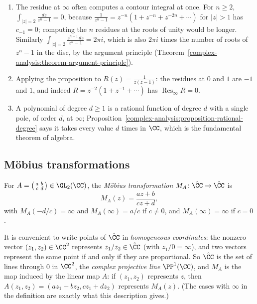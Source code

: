 \begin{example}\label{complex-analysis:example-residue-infinity}
\begin{enumerate}
\item The residue at $\infty$ often computes a contour integral at once. For $n \geq 2$, $\int_{|z| = 2}\frac{dz}{z^n - 1} = 0$, because $\frac{1}{z^n - 1} = z^{-n}(1 + z^{-n} + z^{-2n} + \cdots)$ for $|z| > 1$ has
$c_{-1} = 0$; computing the $n$ residues at the roots of unity would be longer. Similarly $\int_{|z| = 2}\frac{z^{n-1}\,dz}{z^n - 1} = 2\pi i$, which is also $2\pi i$ times the number of roots of $z^n - 1$ in the
disc, by the argument principle (Theorem~\ref{complex-analysis:theorem-argument-principle}).
\item Applying the proposition to $R(z) = \frac{1}{z(z - 1)}$: the residues at $0$ and $1$ are $-1$ and $1$, and indeed $R = z^{-2}(1 + z^{-1} + \cdots)$ has $\operatorname{Res}_\infty R = 0$.
\item A polynomial of degree $d \geq 1$ is a rational function of degree $d$ with a single pole, of order $d$, at $\infty$; Proposition~\ref{complex-analysis:proposition-rational-degree} says it takes every value $d$
times in $\CC$, which is the fundamental theorem of algebra.
\end{enumerate}
\end{example}

\subsection{M\"obius transformations}\label{complex-analysis:subsection-mobius}

\begin{definition}\label{complex-analysis:definition-mobius}
For $A = \bigl(\begin{smallmatrix}a & b\\ c & d\end{smallmatrix}\bigr) \in \GL_2(\CC)$, the \emph{M\"obius transformation} $M_A \colon \hat{\CC} \to \hat{\CC}$ is
\[
M_A(z) = \frac{az + b}{cz + d},
\]
with $M_A(-d/c) = \infty$ and $M_A(\infty) = a/c$ if $c \neq 0$, and $M_A(\infty) = \infty$ if $c = 0$.
\end{definition}

It is convenient to write points of $\hat{\CC}$ in \emph{homogeneous coordinates}: the nonzero vector $(z_1, z_2) \in \CC^2$ represents $z_1/z_2 \in \hat{\CC}$ (with $z_1/0 = \infty$), and two vectors represent the same
point if and only if they are proportional. So $\hat{\CC}$ is the set of lines through $0$ in $\CC^2$, the \emph{complex projective line} $\PP^1(\CC)$, and $M_A$ is the map induced by the linear map $A$: if
$(z_1, z_2)$ represents $z$, then $A(z_1, z_2) = (az_1 + bz_2, cz_1 + dz_2)$ represents $M_A(z)$. (The cases with $\infty$ in the definition are exactly what this description gives.)

